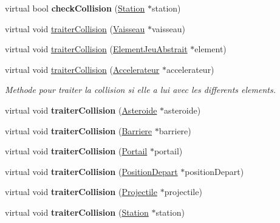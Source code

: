 \begin{DoxyCompactItemize}
\item 
\hypertarget{class_accelerateur_aeb1f74adbddbddf58d2dc09c8f6c2e34}{virtual bool {\bfseries check\-Collision} (\hyperlink{class_station}{Station} $\ast$station)}\label{class_accelerateur_aeb1f74adbddbddf58d2dc09c8f6c2e34}

\item 
virtual void \hyperlink{group__inf2990_ga6a95509f0fcb19be7475a4a5474583a4}{traiter\-Collision} (\hyperlink{class_vaisseau}{Vaisseau} $\ast$vaisseau)
\item 
virtual void \hyperlink{class_accelerateur_ab4e3a5f0fb2efdafe4ef6746068c73b0}{traiter\-Collision} (\hyperlink{class_element_jeu_abstrait}{Element\-Jeu\-Abstrait} $\ast$element)
\item 
\hypertarget{class_accelerateur_ada602e23f6c55a15519d9b552ea3c58b}{virtual void \hyperlink{class_accelerateur_ada602e23f6c55a15519d9b552ea3c58b}{traiter\-Collision} (\hyperlink{class_accelerateur}{Accelerateur} $\ast$accelerateur)}\label{class_accelerateur_ada602e23f6c55a15519d9b552ea3c58b}

\begin{DoxyCompactList}\small\item\em Methode pour traiter la collision si elle a lui avec les differents elements. \end{DoxyCompactList}\item 
\hypertarget{class_accelerateur_a883b1b41fa23cf033517a2da5f51ccbd}{virtual void {\bfseries traiter\-Collision} (\hyperlink{class_asteroide}{Asteroide} $\ast$asteroide)}\label{class_accelerateur_a883b1b41fa23cf033517a2da5f51ccbd}

\item 
\hypertarget{class_accelerateur_a10595ee8cf0d6f79609733c543971a69}{virtual void {\bfseries traiter\-Collision} (\hyperlink{class_barriere}{Barriere} $\ast$barriere)}\label{class_accelerateur_a10595ee8cf0d6f79609733c543971a69}

\item 
\hypertarget{class_accelerateur_af07cb95ae53037e8947353254ee6ece5}{virtual void {\bfseries traiter\-Collision} (\hyperlink{class_portail}{Portail} $\ast$portail)}\label{class_accelerateur_af07cb95ae53037e8947353254ee6ece5}

\item 
\hypertarget{class_accelerateur_ab14c0dd64c691ee4d586dfeef881ec2b}{virtual void {\bfseries traiter\-Collision} (\hyperlink{class_position_depart}{Position\-Depart} $\ast$position\-Depart)}\label{class_accelerateur_ab14c0dd64c691ee4d586dfeef881ec2b}

\item 
\hypertarget{class_accelerateur_a7e55fed6f2d27c73b3b4063f5c992174}{virtual void {\bfseries traiter\-Collision} (\hyperlink{class_projectile}{Projectile} $\ast$projectile)}\label{class_accelerateur_a7e55fed6f2d27c73b3b4063f5c992174}

\item 
\hypertarget{class_accelerateur_a6797ee1374e0cbff0e02b4374da67c35}{virtual void {\bfseries traiter\-Collision} (\hyperlink{class_station}{Station} $\ast$station)}\label{class_accelerateur_a6797ee1374e0cbff0e02b4374da67c35}

\end{DoxyCompactItemize}
